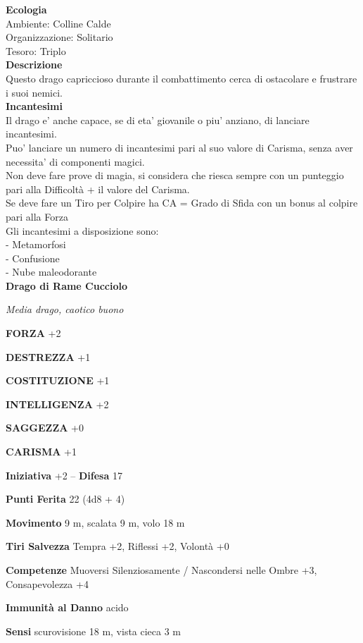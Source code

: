 \begin{multicols}{2}
\textbf{Ecologia}\\
Ambiente: Colline Calde\\
Organizzazione: Solitario\\
Tesoro: Triplo\\
\textbf{Descrizione}\\
Questo drago capriccioso durante il combattimento cerca di ostacolare e frustrare i suoi nemici.\\
\textbf{Incantesimi}\\
Il drago e' anche capace, se di eta' giovanile o piu' anziano, di lanciare incantesimi.\\
Puo' lanciare un numero di incantesimi pari al suo valore di Carisma, senza aver necessita' di componenti magici.\\
Non deve fare prove di magia, si considera che riesca sempre con un punteggio pari alla Difficoltà + il valore del Carisma.\\
Se deve fare un Tiro per Colpire ha CA = Grado di Sfida con un bonus al colpire pari alla Forza\\
Gli incantesimi a disposizione sono:\\
- Metamorfosi\\
- Confusione\\
- Nube maleodorante\\

\textbf{Drago di Rame Cucciolo}

\emph{Media drago, caotico buono}

\textbf{FORZA} +2

\textbf{DESTREZZA} +1

\textbf{COSTITUZIONE} +1

\textbf{INTELLIGENZA} +2

\textbf{SAGGEZZA} +0

\textbf{CARISMA} +1

\textbf{Iniziativa} +2 -- \textbf{Difesa} 17

\textbf{Punti Ferita} 22 (4d8 + 4)

\textbf{Movimento} 9 m, scalata 9 m, volo 18 m

\textbf{Tiri Salvezza} Tempra +2, Riflessi +2, Volontà +0

\textbf{Competenze} Muoversi Silenziosamente / Nascondersi nelle Ombre +3, Consapevolezza +4

\textbf{Immunità al Danno} acido

\textbf{Sensi} scurovisione 18 m, vista cieca 3 m


\end{multicols}

